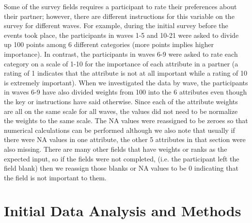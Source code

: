\documentclass{article}
\begin{document}
Some of the survey fields requires a participant to rate their preferences about their partner; however, there are different instructions for this variable on the survey for different waves.  For example, during the initial survey before the events took place, the participants in waves 1-5 and 10-21 were asked to divide up 100 points among 6 different categories (more points implies higher importance).  In contrast, the participants in waves 6-9 were asked to rate each category on a scale of 1-10 for the importance of each attribute in a partner (a rating of 1 indicates that the attribute is not at all important while a rating of 10 is extremely important).  When we investigated the data by wave, the participants in waves 6-9 have also divided weights from 100 into the 6 attributes even though the key or instructions have said otherwise. Since each of the attribute weights are all on the same scale for all waves, the values did not need to be normalize the weights to the same scale.  The NA values were reassigned to be zeroes so that numerical calculations can be performed although we also note that usually if there were NA values in one attribute, the other 5 attributes in that section were also missing.  There are many other fields that have weights or ranks as the expected input, so if the fields were not completed, (i.e. the participant left the field blank) then we reassign those blanks or NA values to be 0 indicating that the field is not important to them.\\



\section{Initial Data Analysis and Methods}
\end{document}
